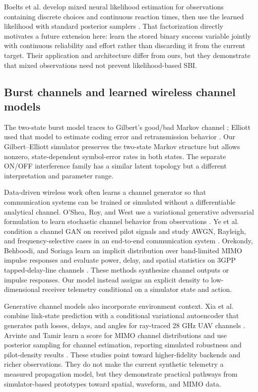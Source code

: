 \documentclass[10pt]{article}
\begin{document}
Boelts et al. develop mixed neural likelihood estimation for observations containing discrete choices and continuous reaction times, then use the learned likelihood with standard posterior samplers \cite{boelts2022flexible}. That factorization directly motivates a future extension here: learn the stored binary success variable jointly with continuous reliability and effort rather than discarding it from the current target. Their application and architecture differ from ours, but they demonstrate that mixed observations need not prevent likelihood-based SBI.

\subsection{Burst channels and learned wireless channel models}

The two-state burst model traces to Gilbert's good/bad Markov channel \cite{gilbert1960capacity}; Elliott used that model to estimate coding error and retransmission behavior \cite{elliott1963estimates}. Our Gilbert--Elliott simulator preserves the two-state Markov structure but allows nonzero, state-dependent symbol-error rates in both states. The separate ON/OFF interference family has a similar latent topology but a different interpretation and parameter range.

Data-driven wireless work often learns a channel generator so that communication systems can be trained or simulated without a differentiable analytical channel. O'Shea, Roy, and West use a variational generative adversarial formulation to learn stochastic channel behavior from observations \cite{oshea2019approximating}. Ye et al. condition a channel GAN on received pilot signals and study AWGN, Rayleigh, and frequency-selective cases in an end-to-end communication system \cite{ye2020conditional}. Orekondy, Behboodi, and Soriaga learn an implicit distribution over band-limited MIMO impulse responses and evaluate power, delay, and spatial statistics on 3GPP tapped-delay-line channels \cite{orekondy2022mimogan}. These methods synthesize channel outputs or impulse responses. Our model instead assigns an explicit density to low-dimensional receiver telemetry conditional on a simulator state and action.

Generative channel models also incorporate environment context. Xia et al. combine link-state prediction with a conditional variational autoencoder that generates path losses, delays, and angles for ray-traced 28 GHz UAV channels \cite{xia2022generative}. Arvinte and Tamir learn a score for MIMO channel distributions and use posterior sampling for channel estimation, reporting simulated robustness and pilot-density results \cite{arvinte2023score}. These studies point toward higher-fidelity backends and richer observations. They do not make the current synthetic telemetry a measured propagation model, but they demonstrate practical pathways from simulator-based prototypes toward spatial, waveform, and MIMO data.
\end{document}
